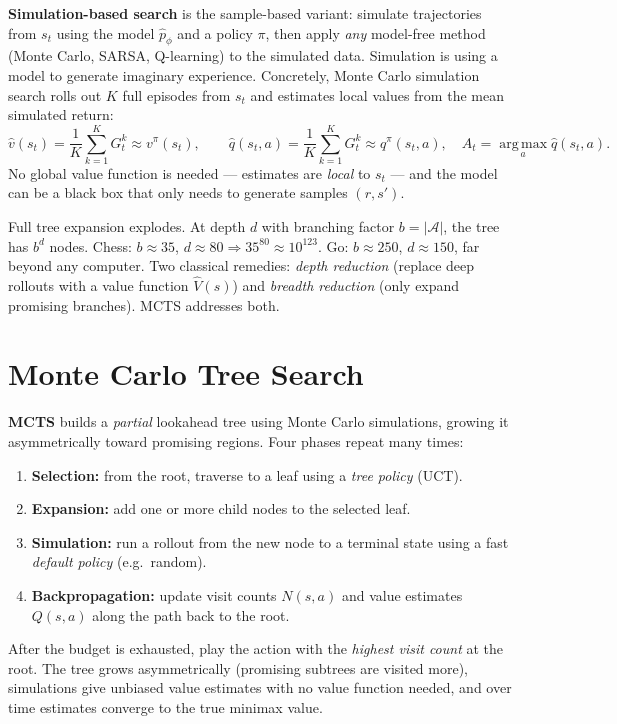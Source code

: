 \documentclass[11pt, oneside]{book}
\newcommand{\argmax}{\operatorname*{arg\,max}}
\newcommand{\abs}[1]{\left\lvert #1 \right\rvert}
\newcommand{\Aset}{\mathcal{A}}          %
\begin{document}
\textbf{Simulation-based search} is the sample-based variant: simulate trajectories from
$s_t$ using the model $\hat p_\phi$ and a policy $\pi$, then apply \emph{any} model-free
method (Monte Carlo, SARSA, Q-learning) to the simulated data. Simulation is using a model
to generate imaginary experience. Concretely, Monte Carlo simulation search rolls out $K$
full episodes from $s_t$ and estimates local values from the mean simulated return:
\[
  \hat v(s_t) = \frac{1}{K}\sum_{k=1}^K G_t^k \approx v^\pi(s_t),
  \qquad
  \hat q(s_t, a) = \frac{1}{K}\sum_{k=1}^K G_t^k \approx q^\pi(s_t, a),
  \quad A_t = \argmax_a \hat q(s_t, a).
\]
No global value function is needed --- estimates are \emph{local} to $s_t$ --- and the
model can be a black box that only needs to generate samples $(r, s')$.

\begin{notebox}[title={The branching problem}]
Full tree expansion explodes. At depth $d$ with branching factor $b = \abs{\Aset}$, the
tree has $b^d$ nodes. Chess: $b\approx 35$, $d\approx 80 \Rightarrow 35^{80}\approx 10^{123}$.
Go: $b\approx 250$, $d\approx 150$, far beyond any computer. Two classical remedies:
\emph{depth reduction} (replace deep rollouts with a value function $\hat V(s)$) and
\emph{breadth reduction} (only expand promising branches). MCTS addresses both.
\end{notebox}

\section{Monte Carlo Tree Search}

\textbf{MCTS} builds a \emph{partial} lookahead tree using Monte Carlo simulations, growing
it asymmetrically toward promising regions. Four phases repeat many times:
\begin{enumerate}
  \item \textbf{Selection:} from the root, traverse to a leaf using a \emph{tree policy} (UCT).
  \item \textbf{Expansion:} add one or more child nodes to the selected leaf.
  \item \textbf{Simulation:} run a rollout from the new node to a terminal state using a fast
    \emph{default policy} (e.g.\ random).
  \item \textbf{Backpropagation:} update visit counts $N(s,a)$ and value estimates $Q(s,a)$
    along the path back to the root.
\end{enumerate}
After the budget is exhausted, play the action with the \emph{highest visit count} at the
root. The tree grows asymmetrically (promising subtrees are visited more), simulations give
unbiased value estimates with no value function needed, and over time estimates converge to
the true minimax value.
\end{document}
